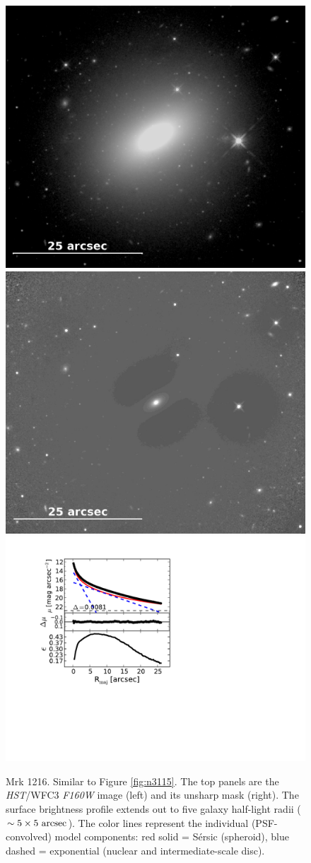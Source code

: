 \documentclass[useAMS,usenatbib,article]{mnras}
\begin{document}
\begin{figure}
\begin{center}
\includegraphics[width=0.49\columnwidth]{mrk1216_image.jpeg}
\includegraphics[width=0.49\columnwidth]{mrk1216_unsharp.jpeg} \\
\includegraphics[width=1.05\columnwidth]{mrk1216_decomposition.pdf}
\caption{Mrk 1216. 
Similar to Figure \ref{fig:n3115}. 
The top panels are the \emph{HST}/WFC3 \emph{F160W} image (left) and its unsharp mask (right).
The surface brightness profile extends out to five galaxy half-light radii ($\sim 5 \times 5~\rm arcsec$). 
The color lines represent the individual (PSF-convolved) model components:
red solid = S\'ersic (spheroid), blue dashed = exponential (nuclear and intermediate-scale disc). 
}
\label{fig:m1216}
\end{center}
\end{figure}
\end{document}
